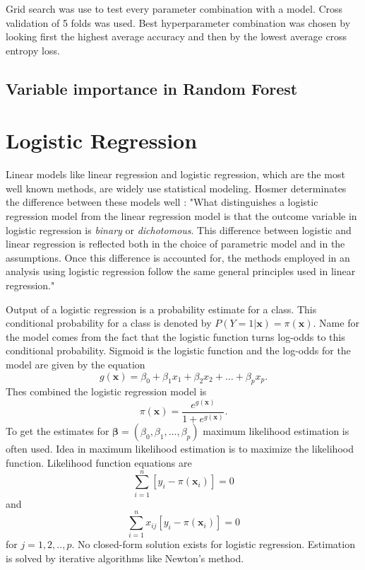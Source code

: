 Grid search was use to test every parameter combination with a model. Cross validation of 5 folds was used. Best hyperparameter combination was chosen by looking first the highest average accuracy and then by the lowest average cross entropy loss.


\subsection{Variable importance in Random Forest}
\section{Logistic Regression}
Linear models like linear regression and logistic regression, which are the most well known methods, are widely use statistical modeling. Hosmer determinates the difference between these models well \cite{hosmer2013applied}: "What distinguishes a logistic regression model from  the linear regression model is that the outcome variable in logistic regression is \textit{binary} or \textit{dichotomous}. This difference between logistic and linear regression is reflected both in the choice of parametric model and in the assumptions. Once this difference is accounted for, the methods employed in an analysis using logistic regression follow the same general principles used in linear regression."

Output of a logistic regression is a probability estimate for a class. This conditional probability for a class is denoted by $P ( Y = 1 | \mathbf { x } ) = \pi ( \mathbf { x } )$. Name for the model comes from the fact that the logistic function turns log-odds to this conditional probability. Sigmoid is the logistic function and the log-odds for the model are given by the equation
\begin{equation}
    g ( \mathbf { x } ) = \beta _ { 0 } + \beta _ { 1 } x _ { 1 } + \beta _ { 2 } x _ { 2 } + \ldots + \beta _ { p } x _ { p }.
\end{equation}
Thes combined the logistic regression model is
\begin{equation}
    \pi ( \mathbf { x } ) = \frac { e ^ { g ( \mathbf { x } ) } } { 1 + e ^ { g ( \mathbf { x } ) } }.
\end{equation}
To get the estimates for $\boldsymbol { \beta } = \left( \beta _ { 0 } , \beta _ { 1 } , \ldots , \beta _ { p } \right)$ maximum likelihood estimation is often used. Idea in maximum likelihood estimation is to maximize the likelihood function. Likelihood function equations are
\begin{equation}
    \sum _ { i = 1 } ^ { n } \left[ y _ { i } - \pi \left( \mathbf { x } _ { i } \right) \right] = 0
\end{equation}
and
\begin{equation}
    \sum _ { i = 1 } ^ { n } x _ { i j } \left[ y _ { i } - \pi \left( \mathbf { x } _ { i } \right) \right] = 0
\end{equation}
for $j=1,2,..,p$. \cite{hosmer2013applied} No closed-form solution exists for logistic regression. Estimation is solved by iterative algorithms like Newton's method.
